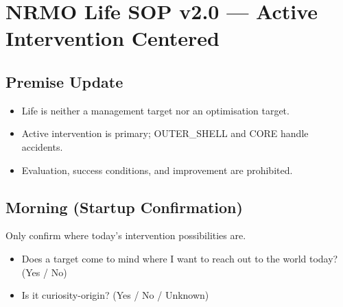 
\chapter{NRMO Life SOP v2.0 ---
Active Intervention Centered}
\label{ch:nrmo-life-sop}


\section{Premise Update}
\label{sec:life-sop-premise}

\begin{itemize}
\item Life is neither a management target nor an optimisation
target.
\item Active intervention is primary; OUTER\_SHELL and CORE handle
accidents.
\item Evaluation, success conditions, and improvement are
prohibited.
\end{itemize}

\section{Morning (Startup Confirmation)}
\label{sec:life-sop-morning}

Only confirm where today's intervention possibilities are.

\begin{itemize}
\item[$\square$] Does a target come to mind where I want to reach
out to the world today? (Yes / No)
\item[$\square$] Is it curiosity-origin? (Yes / No / Unknown)
\end{itemize}

